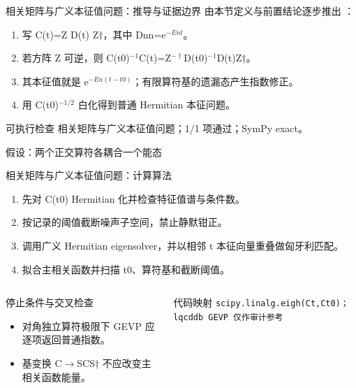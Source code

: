 \begin{frame}[t]{相关矩阵与广义本征值问题：推导与证据边界}
\footnotesize
{}\quad 由本节定义与前置结论逐步推出 ：
\begin{enumerate}
\item 写 C(t)=Z D(t) Z†，其中 Dnn=e\ensuremath{^{-Ent}}。
\item 若方阵 Z 可逆，则 C(t0)\ensuremath{^{-1}}C(t)=Z\ensuremath{^{-\dagger}}D(t0)\ensuremath{^{-1}}D(t)Z†。
\item 其本征值就是 e\ensuremath{^{-En(t-t0)}}；有限算符基的遗漏态产生指数修正。
\item 用 C(t0)\ensuremath{^{-1/2}} 白化得到普通 Hermitian 本征问题。
\end{enumerate}\begin{block}{可执行检查}
\quad 相关矩阵与广义本征值问题；1/1 项通过；SymPy exact。
\par\scriptsize 假设：两个正交算符各耦合一个能态
\end{block}
\end{frame}

\begin{frame}[t]{相关矩阵与广义本征值问题：计算算法}
\footnotesize
{}\begin{enumerate}
\item 先对 C(t0) Hermitian 化并检查特征值谱与条件数。
\item 按记录的阈值截断噪声子空间，禁止静默钳正。
\item 调用广义 Hermitian eigensolver，并以相邻 t 本征向量重叠做匈牙利匹配。
\item 拟合主相关函数并扫描 t0、算符基和截断阈值。
\end{enumerate}\begin{columns}[T,onlytextwidth]
\begin{block}{停止条件与交叉检查}\scriptsize\begin{itemize}
\item[\CheckMark] 对角独立算符极限下 GEVP 应逐项返回普通指数。
\item[\CheckMark] 基变换 C\ensuremath{\rightarrow}SCS† 不应改变主相关函数能量。
\end{itemize}\end{block}
\begin{block}{代码映射}
\scriptsize \texttt{scipy.\allowbreak{}linalg.\allowbreak{}eigh(Ct,Ct0)；lqcddb GEVP 仅作审计参考}
\end{block}\end{columns}\end{frame}

